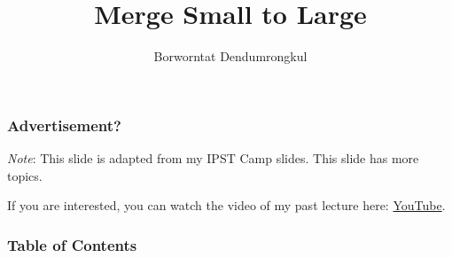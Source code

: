 \documentclass{beamer}
\title[Merge Small to Large] %
{Merge Small to Large}
\author[Borworntat Dendumrongkul] %
{Borworntat Dendumrongkul}
\institute[IOITTT] %
{
  IOI Thailand Task Team
}
\date{}
\begin{document}
\frame{\titlepage}

\begin{frame}
\frametitle{Advertisement?}
\textit{Note}: This slide is adapted from my IPST Camp slides. This slide has more topics.

\medskip

If you are interested, you can watch the video of my past lecture here: \href{https://youtu.be/Fzr-l6ZpTNE?si=DK6dO0cq5Plyu-EF}{YouTube}.
\end{frame}

\begin{frame}
\frametitle{Table of Contents}
\tableofcontents
\end{frame}






% 



% 



\end{document}
